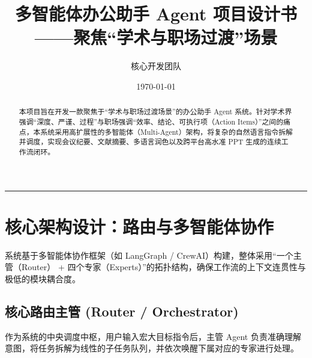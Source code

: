 \documentclass[12pt, a4paper]{ctexart}
\title{\textbf{多智能体办公助手 Agent 项目设计书}\\ \large ——聚焦“学术与职场过渡”场景}
\author{核心开发团队}
\date{\today}
\begin{document}
\maketitle

\begin{abstract}
本项目旨在开发一款聚焦于“学术与职场过渡场景”的办公助手 Agent 系统。针对学术界强调“深度、严谨、过程”与职场强调“效率、结论、可执行项（Action Items）”之间的痛点，本系统采用高扩展性的多智能体（Multi-Agent）架构，将复杂的自然语言指令拆解并调度，实现会议纪要、文献摘要、多语言润色以及跨平台高水准 PPT 生成的连续工作流闭环。
\end{abstract}

\vspace{1em}
\hrule
\vspace{1em}

\section{核心架构设计：路由与多智能体协作}
系统基于多智能体协作框架（如 LangGraph / CrewAI）构建，整体采用“一个主管（Router） + 四个专家（Experts）”的拓扑结构，确保工作流的上下文连贯性与极低的模块耦合度。

\subsection{核心路由主管 (Router / Orchestrator)}
作为系统的中央调度中枢，用户输入宏大目标指令后，主管 Agent 负责准确理解意图，将任务拆解为线性的子任务队列，并依次唤醒下属对应的专家进行处理。
\end{document}

